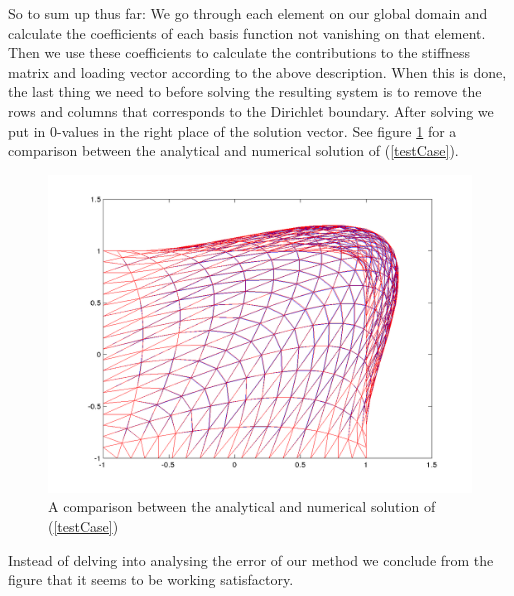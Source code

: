 \documentclass[paper=a4, fontsize=11pt]{scrartcl} %
\begin{document}
So to sum up thus far: We go through each element on our global domain and calculate the coefficients of each basis function not vanishing on that element. Then we use these coefficients to calculate the contributions to the stiffness matrix and loading vector according to the above description. When this is done, the last thing we need to before solving the resulting system is to remove the rows and columns that corresponds to the Dirichlet boundary. After solving we put in $0$-values in the right place of the solution vector. See figure \ref{fig:TestCase} for a comparison between the analytical and numerical solution of (\ref{testCase}).
\begin{figure}
\centering
\includegraphics[scale=0.5]{Part2oppg2d20.png}
\caption{A comparison between the analytical and numerical solution of (\ref{testCase})}
\label{fig:TestCase}
\end{figure}
Instead of delving into analysing the error of our method we conclude from the figure that it seems to be working satisfactory.
\end{document}
